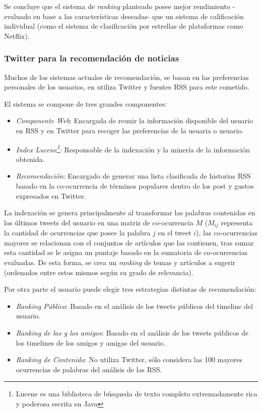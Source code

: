 	Se concluye que el sistema de \emph{ranking} planteado posee mejor rendimiento -evaluado en base a las características deseadas- que un sistema de calificación individual (como el sistema de clasificación por estrellas de plataformas como Netflix).
	
\subsubsection{Twitter para la recomendación de noticias}

	Muchos de los sistemas actuales de recomendación, se basan en las preferencias personales de los usuarios, en \cite{Phelan:2009:UTR:1639714.1639794} utiliza Twitter y fuentes RSS para este cometido.
	
	El sistema se compone de tres grandes componentes:
	\begin{itemize}
		\item \textit{Componente Web}: Encargada de reunir la información disponible del usuario en RSS y en Twitter para recoger las preferencias de la usuaria o usuario.
		\item \textit{Index Lucene\footnote{Lucene es una biblioteca de búsqueda de texto completo extremadamente rica y poderosa escrita en Java}}: Responsable de la indexación y la minería de la información obtenida.
		\item \textit{Recomendación}: Encargado de generar una lista clasificada de historias RSS basado en la co-ocurrencia de términos populares dentro de los post y gustos expresados en Twitter.
	\end{itemize}
	
	La indexación se genera principalmente al transformar las palabras contenidas en los últimos tweets del usuario en una matriz de co-ocurrencia $M$ ($M_{ij}$ representa la cantidad de ocurrencias que posee la palabra $j$ en
	el tweet $i$), las co-ocurrencias mayores se relacionan con el conjuntos de artículos que las contienen, tras sumar esta cantidad se le asigna un puntaje basado en la sumatoria de co-ocurrencias evaluadas. De esta forma, se crea un \emph{ranking} de temas y artículos a sugerir (ordenados entre estos mismos según su grado de relevancia). 
	
	Por otra parte el usuario puede elegir tres estrategias distintas de recomendación: 
	
	\begin{itemize}
		\item \textit{Ranking Público}: Basado en el análisis de los tweets públicos del timeline del usuario.
		\item \textit{Ranking de las y los amigos}: Basado en el análisis de los tweets públicos de los timelines de los amigos y amigas del usuario.
		\item \textit{Ranking de Contenido}: No utiliza Twitter, sólo considera las 100 mayores ocurrencias de palabras del análisis de las RSS.
	\end{itemize}
   
